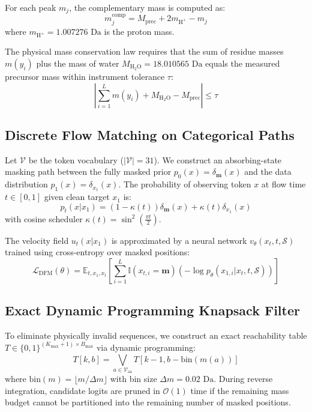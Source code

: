 \documentclass[10pt,journal,compsoc]{IEEEtran}
\begin{document}
For each peak $m_j$, the complementary mass is computed as:
\begin{equation}
m_j^{\text{comp}} = M_{\text{prec}} + 2 m_{\text{H}^+} - m_j
\end{equation}
where $m_{\text{H}^+} = 1.007276\text{ Da}$ is the proton mass.

The physical mass conservation law requires that the sum of residue masses $m(y_i)$ plus the mass of water $M_{\text{H}_2\text{O}} = 18.010565\text{ Da}$ equals the measured precursor mass within instrument tolerance $\tau$:
\begin{equation}
\left| \sum_{i=1}^L m(y_i) + M_{\text{H}_2\text{O}} - M_{\text{prec}} \right| \le \tau
\end{equation}

\subsection{Discrete Flow Matching on Categorical Paths}
Let $\mathcal{V}$ be the token vocabulary ($|\mathcal{V}| = 31$). We construct an absorbing-state masking path between the fully masked prior $p_0(x) = \delta_{\mathbf{m}}(x)$ and the data distribution $p_1(x) = \delta_{x_1}(x)$. The probability of observing token $x$ at flow time $t \in [0, 1]$ given clean target $x_1$ is:
\begin{equation}
p_t(x | x_1) = (1 - \kappa(t)) \delta_{\mathbf{m}}(x) + \kappa(t) \delta_{x_1}(x)
\end{equation}
with cosine scheduler $\kappa(t) = \sin^2\left(\frac{\pi t}{2}\right)$.

The velocity field $u_t(x | x_1)$ is approximated by a neural network $v_\theta(x_t, t, \mathcal{S})$ trained using cross-entropy over masked positions:
\begin{equation}
\mathcal{L}_{\text{DFM}}(\theta) = \mathbb{E}_{t, x_1, x_t} \left[ \sum_{i=1}^L \mathbb{I}(x_{t,i}=\mathbf{m}) \left( -\log p_\theta(x_{1,i} | x_t, t, \mathcal{S}) \right) \right]
\end{equation}

\subsection{Exact Dynamic Programming Knapsack Filter}
To eliminate physically invalid sequences, we construct an exact reachability table $T \in \{0, 1\}^{(K_{\max}+1) \times B_{\max}}$ via dynamic programming:
\begin{equation}
T[k, b] = \bigvee_{a \in \mathcal{V}_{\text{aa}}} T[k-1, b - \text{bin}(m(a))]
\end{equation}
where $\text{bin}(m) = \lfloor m / \Delta m \rfloor$ with bin size $\Delta m = 0.02\text{ Da}$. During reverse integration, candidate logits are pruned in $\mathcal{O}(1)$ time if the remaining mass budget cannot be partitioned into the remaining number of masked positions.
\end{document}
